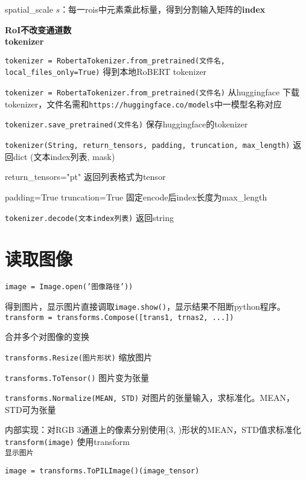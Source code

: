 \documentclass[UTF8]{ctexart}
\begin{document}
  \quad spatial\_scale $s$：每一rois中元素乘此标量，得到分割输入矩阵的\textbf{index}

  \textbf{RoI不改变通道数}\\
\textbf{tokenizer}

  \texttt{tokenizer = RobertaTokenizer.from\_pretrained(文件名, local\_files\_only=True)} 得到本地RoBERT tokenizer

  \texttt{tokenizer = RobertaTokenizer.from\_pretrained(文件名)} 从huggingface 下载tokenizer，文件名需和\texttt{https://huggingface.co/models}中一模型名称对应

  \texttt{tokenizer.save\_pretrained(文件名)} 保存huggingface的tokenizer

  \texttt{tokenizer(String, return\_tensors, padding, truncation, max\_length)} 返回dict (文本index列表, mask)

  \quad return\_tensors="pt" 返回列表格式为tensor

  \quad padding=True truncation=True 固定encode后index长度为max\_length

  \texttt{tokenizer.decode(文本index列表)} 返回string

\section{读取图像}
\noindent \texttt{image = Image.open('图像路径'))}

  得到图片，显示图片直接调取\texttt{image.show()}，显示结果不阻断python程序。\\
\texttt{transform = transforms.Compose([trans1, trnas2, ...])}

  合并多个对图像的变换

  \texttt{transforms.Resize(图片形状)} 缩放图片

  \texttt{transforms.ToTensor()} 图片变为张量

  \texttt{transforms.Normalize(MEAN, STD)} 对图片的张量输入，求标准化。MEAN，STD可为张量
  
  \quad 内部实现：对RGB 3通道上的像素分别使用(3, )形状的MEAN，STD值求标准化\\
\texttt{transform(image)} 使用transform\\
\texttt{显示图片}

  \texttt{image = transforms.ToPILImage()(image\_tensor)}
\end{document}
